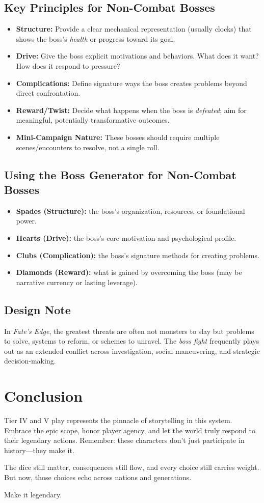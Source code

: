 \subsection*{Key Principles for Non-Combat Bosses}
\begin{itemize}
  \item \textbf{Structure:} Provide a clear mechanical representation (usually clocks) that shows the boss's \emph{health} or progress toward its goal.
  \item \textbf{Drive:} Give the boss explicit motivations and behaviors. What does it want? How does it respond to pressure?
  \item \textbf{Complications:} Define signature ways the boss creates problems beyond direct confrontation.
  \item \textbf{Reward/Twist:} Decide what happens when the boss is \emph{defeated}; aim for meaningful, potentially transformative outcomes.
  \item \textbf{Mini-Campaign Nature:} These bosses should require multiple scenes/encounters to resolve, not a single roll.
\end{itemize}

\subsection*{Using the Boss Generator for Non-Combat Bosses}
\begin{itemize}
  \item \textbf{Spades (Structure):} the boss's organization, resources, or foundational power.
  \item \textbf{Hearts (Drive):} the boss's core motivation and psychological profile.
  \item \textbf{Clubs (Complication):} the boss's signature methods for creating problems.
  \item \textbf{Diamonds (Reward):} what is gained by overcoming the boss (may be narrative currency or lasting leverage).
\end{itemize}

\subsection*{Design Note}
In \textit{Fate's Edge}, the greatest threats are often not monsters to slay but problems to solve, systems to reform, or schemes to unravel. The \emph{boss fight} frequently plays out as an extended conflict across investigation, social maneuvering, and strategic decision-making.

\section{Conclusion}

Tier IV and V play represents the pinnacle of storytelling in this system. Embrace the epic scope, honor player agency, and let the world truly respond to their legendary actions. Remember: these characters don't just participate in history---they make it.

The dice still matter, consequences still flow, and every choice still carries weight. But now, those choices echo across nations and generations.

Make it legendary.
